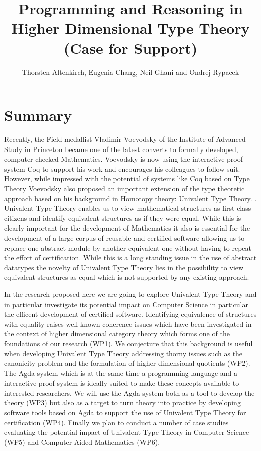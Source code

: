 \documentclass[a4paper]{article}
\title{Programming and Reasoning in Higher Dimensional Type Theory \\
\LARGE (Case for Support)}
\author{Thorsten Altenkirch, Eugenia Chang, Neil Ghani and Ondrej Rypacek}
\date{}
\begin{document}
\maketitle
\section*{Summary}

Recently, the Field medallist Vladimir Voevodsky of the Institute of
Advanced Study in Princeton became one of the latest converts to
formally developed, computer checked Mathematics. Voevodsky is now
using the interactive proof system Coq to support his work and
encourages his colleagues to follow suit. However, while impressed
with the potential of systems like Coq based on Type Theory Voevodsky
also proposed an important extension of the type theoretic approach
based on his background in Homotopy theory: Univalent Type Theory.
\cite{voevodsky,awodey}. 
Univalent Type Theory enables us to view mathematical structures as
first class citizens and identify equivalent structures as if they
were equal. While this is clearly important for the development of
Mathematics it also is essential for the development of a large corpus
of reusable and certified software allowing us to replace one abstract
module by another equivalent one without having to repeat the effort
of certification. While this is a long standing issue in the use of
abstract datatypes the novelty of Univalent Type Theory lies in the
possibility to view equivalent structures as equal which is not
supported by any existing approach.

In the research proposed here we are going to explore Univalent Type
Theory and in particular investigate its potential impact on Computer
Science in particular the efficent development of certified
software. Identifying equivalence of structures with equality raises
well known coherence issues which have been investigated in the
context of higher dimensional category theory \cite{eugenia} which
forms one of the foundations of our research (WP1). We conjecture that
this background is useful when developing Univalent Type Theory
addressing thorny issues such as the canonicity problem
\cite{harper,voevodsky,coquand} and the formulation of higher
dimensional quotients (WP2). The Agda system \cite{agda} which is at
the same time a programming language and a interactive proof system is
ideally suited to make these concepts available to interested
researchers. We will use the Agda system both as a tool to develop the
theory (WP3) but also as a target to turn theory into practice by developing
software tools based on Agda to support the use of Univalent Type
Theory for certification (WP4). Finally we plan to conduct a number of
case studies evaluating the potential impact of Univalent Type Theory
in Computer Science (WP5) and Computer Aided Mathematics (WP6).
\end{document}
